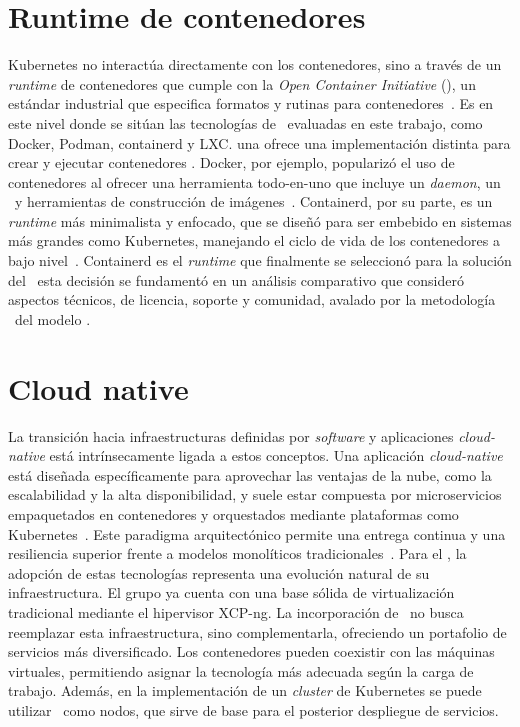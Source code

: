 \section{Runtime de contenedores}
Kubernetes no interactúa directamente con los contenedores, sino a través de un \textit{runtime} de contenedores que cumple con la \textit{Open Container Initiative} (\OCI), un estándar industrial que especifica formatos y rutinas para contenedores~\citep{girma2018evaluation}. Es en este nivel donde se sitúan las tecnologías de \VBC\ evaluadas en este trabajo, como Docker, Podman, containerd y LXC. \@Cada una ofrece una implementación distinta para crear y ejecutar contenedores \OCI. Docker, por ejemplo, popularizó el uso de contenedores al ofrecer una herramienta todo-en-uno que incluye un \textit{daemon}, un \CLI\ y herramientas de construcción de imágenes~\citep{Buchanan2020}. Containerd, por su parte, es un \textit{runtime} más minimalista y enfocado, que se diseñó para ser embebido en sistemas más grandes como Kubernetes, manejando el ciclo de vida de los contenedores a bajo nivel~\citep{protogeros2024cargosync}. Containerd es el \textit{runtime} que finalmente se seleccionó para la solución del \GRID\, esta decisión se fundamentó en un análisis comparativo que consideró aspectos técnicos, de licencia, soporte y comunidad, avalado por la metodología \DAR\ del modelo \CMMI\;\@.

\section{Cloud native}
La transición hacia infraestructuras definidas por \textit{software} y aplicaciones \textit{cloud-native} está intrínsecamente ligada a estos conceptos. Una aplicación \textit{cloud-native} está diseñada específicamente para aprovechar las ventajas de la nube, como la escalabilidad y la alta disponibilidad, y suele estar compuesta por microservicios empaquetados en contenedores y orquestados mediante plataformas como Kubernetes~\citep{gannon2017cloud}. Este paradigma arquitectónico permite una entrega continua y una resiliencia superior frente a modelos monolíticos tradicionales~\citep{oyeniran2024comprehensive}. Para el \GRID, la adopción de estas tecnologías representa una evolución natural de su infraestructura. El grupo ya cuenta con una base sólida de virtualización tradicional mediante el hipervisor XCP-ng. La incorporación de \VBC\ no busca reemplazar esta infraestructura, sino complementarla, ofreciendo un portafolio de servicios más diversificado. Los contenedores pueden coexistir con las máquinas virtuales, permitiendo asignar la tecnología más adecuada según la carga de trabajo. Además, en la implementación de un \textit{cluster} de Kubernetes se puede utilizar \VM\ como nodos, que sirve de base para el posterior despliegue de servicios.

